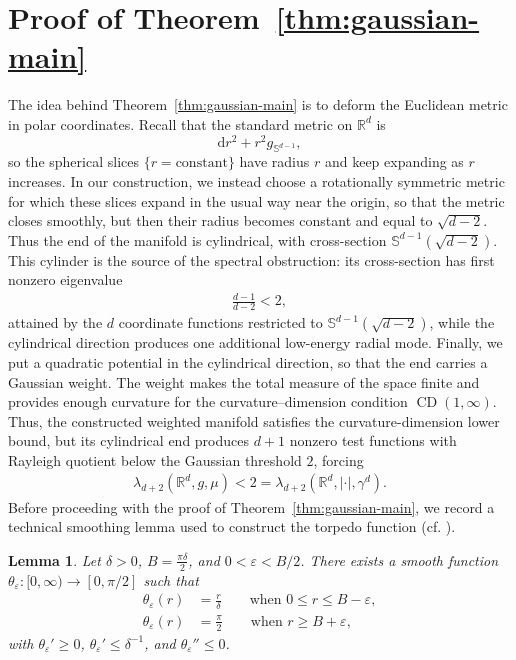 \documentclass[11pt,reqno]{amsart}
\numberwithin{equation}{section}
\newtheorem{lem}[thm]{Lemma}
\theoremstyle{definition}
\theoremstyle{remark}
\newcommand{\te}{\theta}
\newcommand{\ud}{\mathrm{d}}
\newcommand{\0}{\emptyset}
\newcommand{\veps}{\varepsilon}
\newcommand{\bbS}{\mathbb S}
\begin{document}
\section{Proof of Theorem~\ref{thm:gaussian-main}}
The idea behind Theorem~\ref{thm:gaussian-main} is to deform the Euclidean
metric in polar coordinates.  Recall that the standard metric on \(\mathbb R^d\)
is
\[
        \ud r^2+r^2g_{\bbS^{d-1}},
\]
so the spherical slices \(\{r=\mathrm{constant}\}\) have radius \(r\) and keep
expanding as \(r\) increases.  In our construction, we instead choose a
rotationally symmetric metric for which these slices expand in the usual way
near the origin, so that the metric closes smoothly, but then their radius
becomes constant and equal to \(\sqrt{d-2}\).  Thus the end of the manifold is
cylindrical, with cross-section \(\bbS^{d-1}(\sqrt{d-2})\).  This cylinder is the
source of the spectral obstruction: its cross-section has first nonzero
eigenvalue
\begin{align}
        \frac{d-1}{d-2}<2,
\end{align}
attained by the \(d\) coordinate functions restricted to
\(\bbS^{d-1}(\sqrt{d-2})\), while the cylindrical direction produces one
additional low-energy radial mode.  Finally, we put a quadratic potential in the
cylindrical direction, so that the end carries a Gaussian weight.  The weight makes the total measure of the space finite and provides enough
curvature for the curvature--dimension condition
\(\operatorname{CD}(1,\infty)\). Thus, the constructed weighted
manifold satisfies the curvature-dimension lower bound, but its cylindrical end
produces \(d+1\) nonzero test functions with Rayleigh quotient below the
Gaussian threshold \(2\), forcing
\begin{align}
        \lambda_{d+2}(\mathbb R^d,g,\mu)
        <
        2
        =
        \lambda_{d+2}(\mathbb R^d,|\cdot|,\gamma^d).
\end{align}
Before proceeding with the proof of Theorem~\ref{thm:gaussian-main}, we record a
technical smoothing lemma used to construct the torpedo function (cf. \cite{botvinnik2010homotopy}).
\begin{lem}\label{lem:theta-eps}
Let $\delta>0$, $B=\frac{\pi\delta}{2}$, and $0<\veps<B/2$. There exists a smooth function
$\te_\veps:[0,\infty)\to[0,\pi/2]$ such that
\begin{align}
        \te_\veps(r)
        &=
        \frac{r}{\delta}
        \qquad\text{when }0\leq r\leq B-\veps,\\
        \te_\veps(r)
        &=
        \frac{\pi}{2}
        \qquad\text{when }r\geq B+\veps,
\end{align}
with $\te_\veps'\geq0$, $\te_\veps'\leq\delta^{-1}$, and $\te_\veps''\leq0$.
\end{lem}
\end{document}
